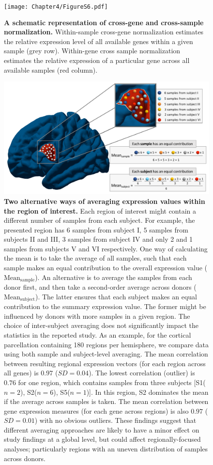 \begin{figure}[h!]
  \centering
    \texttt{[image: Chapter4/FigureS6.pdf]}
\caption{\textbf{A schematic representation of cross-gene and cross-sample normalization.} Within-sample cross-gene normalization estimates the relative expression level of all available genes within a given sample (grey row). Within-gene cross sample normalization estimates the relative expression of a particular gene across all available samples (red column).}
\label{fig:Ch4Sfig6}
\end{figure}

\begin{figure}[h!]
  \centering
    \includegraphics[width=1\textwidth]{Chapter4/FigureS7.pdf}
\caption{\textbf{Two alternative ways of averaging expression values within the region of interest.}
Each region of interest might contain a different number of samples from each subject. For example, the presented region has 6 samples from subject I, 5 samples from subjects II and III, 3 samples from subject IV and only 2 and 1 samples from subjects V and VI respectively. One way of calculating the mean is to take the average of all samples, such that each sample makes an equal contribution to the overall expression value ($\mathrm{Mean_{sample}}$). An alternative is to average the samples from each donor first, and then take a second-order average across donors ($\mathrm{Mean_{subject}}$). The latter ensures that each subject makes an equal contribution to the summary expression value. The former might be influenced by donors with more samples in a given region. The choice of inter-subject averaging does not significantly impact the statistics in the reported study. As an example, for the cortical parcellation containing 180 regions per hemisphere, we compare data using both sample and subject-level averaging. The mean correlation between resulting regional expression vectors (for each region across all genes) is $0.97$ ($SD = 0.04$). The lowest correlation (outlier) is $0.76$ for one region, which contains samples from three subjects [S1($n=2$), S2($n=6$), S5($n=1$)]. In this region, S2 dominates the mean if the average across samples is taken. The mean correlation between gene expression measures (for each gene across regions) is also $0.97$ ($SD = 0.01$) with no obvious outliers. These findings suggest that different averaging approaches are likely to have a minor effect on study findings at a global level, but could affect regionally-focused analyses; particularly regions with an uneven distribution of samples across donors.}

\end{figure}
